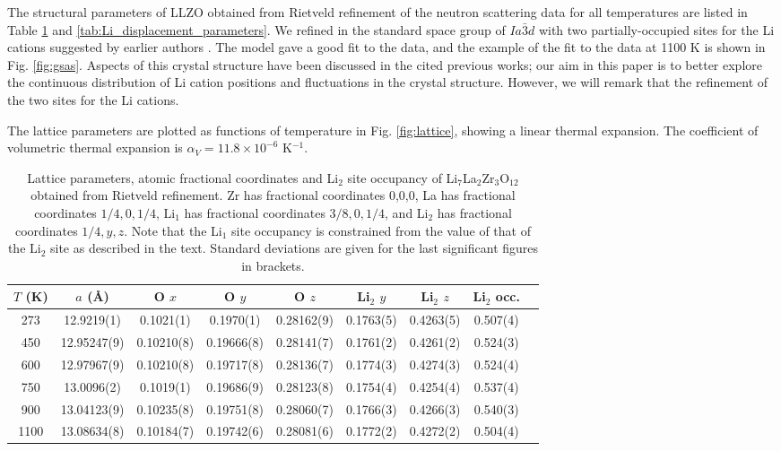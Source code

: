 \documentclass[twoside,twocolumn,9pt]{article}
\begin{document}
The structural parameters of LLZO obtained from Rietveld refinement of the neutron scattering data for all temperatures are listed in Table \ref{tab:Rietveld_structure} and \ref{tab:Li_displacement_parameters}. We refined in the standard space group of $Ia\bar{3}d$ with two partially-occupied sites for the Li cations suggested by earlier authors  \cite{Awaka:2009jv,Buschmann:2011jo,Geiger:2011cg, Awaka:2011il, DanielRettenwander:2016ei,Wagner:2016bh,Kataoka:2019go, Xie:2011gv,Han:2012is,Li:2012fz,Wang:2014ic}. The model gave a good fit to the data, and the example of the fit to the data at 1100 K is shown in Fig. \ref{fig:gsas}.  Aspects of this crystal structure have been discussed in the cited previous works; our aim in this paper is to better explore the continuous distribution of Li cation positions and fluctuations in the crystal structure. However, we will remark that the refinement of the two sites for the Li cations.

The lattice parameters are plotted as functions of temperature in Fig. \ref{fig:lattice}, showing a linear thermal expansion. The coefficient of volumetric thermal expansion is $\alpha_V = 11.8 \times 10^{-6}$ K$^{-1}$.

\begin{table}[t]
\centering
\caption{Lattice parameters, atomic fractional coordinates and Li$_2$ site occupancy of Li$_7$La$_2$Zr$_3$O$_{12}$ obtained from Rietveld refinement. Zr has fractional coordinates 0,0,0, La has fractional coordinates $1/4,0,1/4$, Li$_1$ has fractional coordinates $3/8,0,1/4$, and Li$_2$ has fractional coordinates $1/4,y,z$. Note that the Li$_1$ site occupancy is constrained from the value of that of the Li$_2$ site as described in the text. Standard deviations are given for the last significant figures in brackets. }
\label{tab:Rietveld_structure}
\begin{tabular}{ccccccccc}
\hline
\hline
$T$ (K)  & $a$ (\AA) & O $x$        & O $y$        & O $z$        &  Li$_2$ $y$       & Li$_2$ $z$ & Li$_2$ occ. \\
\hline
273  & 12.9219(1)    & 0.1021(1)      & 0.1970(1)      & 0.28162(9)     & 0.1763(5)           & 0.4263(5)    & 0.507(4) \\
450  & 12.95247(9)   & 0.10210(8)     & 0.19666(8)     & 0.28141(7)     & 0.1761(2)           & 0.4261(2)    & 0.524(3) \\
600  & 12.97967(9)   & 0.10210(8)     & 0.19717(8)     & 0.28136(7)     & 0.1774(3)           & 0.4274(3)    & 0.524(4) \\
750  & 13.0096(2)    & 0.1019(1)      & 0.19686(9)     & 0.28123(8)     & 0.1754(4)           & 0.4254(4)    & 0.537(4) \\
900  & 13.04123(9)   & 0.10235(8)     & 0.19751(8)     & 0.28060(7)     & 0.1766(3)           & 0.4266(3)    & 0.540(3) \\
1100 & 13.08634(8)   & 0.10184(7)     & 0.19742(6)     & 0.28081(6)     & 0.1772(2)           & 0.4272(2)    & 0.504(4) \\
\hline
\hline
\end{tabular}
\end{table}
\end{document}
